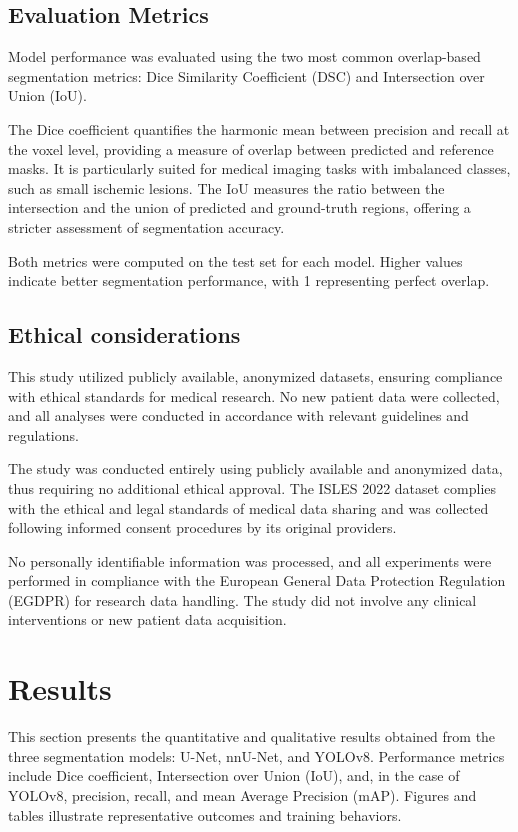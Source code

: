 \documentclass[12pt]{article}
\begin{document}
\subsection{Evaluation Metrics} \label{subsec:metrics}
Model performance was evaluated using the two most common overlap-based segmentation metrics: Dice Similarity Coefficient (DSC) and Intersection over Union (IoU).

The Dice coefficient quantifies the harmonic mean between precision and recall at the voxel level, providing a measure of overlap between predicted and reference masks. It is particularly suited for medical imaging tasks with imbalanced classes, such as small ischemic lesions. The IoU measures the ratio between the intersection and the union of predicted and ground-truth regions, offering a stricter assessment of segmentation accuracy.

Both metrics were computed on the test set for each model. Higher values indicate better segmentation performance, with 1 representing perfect overlap.

\subsection{Ethical considerations} \label{subsec:ethics}
This study utilized publicly available, anonymized datasets, ensuring compliance with ethical standards for medical research. No new patient data were collected, and all analyses were conducted in accordance with relevant guidelines and regulations.

The study was conducted entirely using publicly available and anonymized data, thus requiring no additional ethical approval. The ISLES 2022 dataset complies with the ethical and legal standards of medical data sharing and was collected following informed consent procedures by its original providers.

No personally identifiable information was processed, and all experiments were performed in compliance with the European General Data Protection Regulation (EGDPR) for research data handling. The study did not involve any clinical interventions or new patient data acquisition.

\section{Results} \label{sec:results}

This section presents the quantitative and qualitative results obtained from the three segmentation models: U-Net, nnU-Net, and YOLOv8. Performance metrics include Dice coefficient, Intersection over Union (IoU), and, in the case of YOLOv8, precision, recall, and mean Average Precision (mAP). Figures and tables illustrate representative outcomes and training behaviors.
\end{document}
